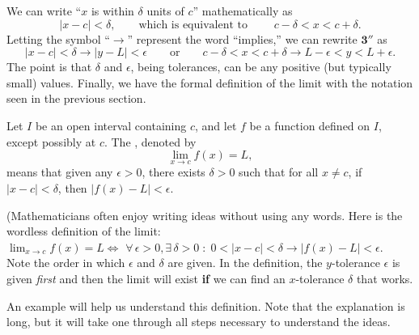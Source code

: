 We can write ``$x$ is within $\delta$ units of $c$'' mathematically as
$$|x-c| < \delta, \qquad \text{which is equivalent to }\qquad c-\delta < x < c+\delta.$$
Letting the symbol ``$\longrightarrow$'' represent the word ``implies,'' we can rewrite $\textbf{3}''$ as 
$$
|x - c| < \delta \longrightarrow  |y - L| < \epsilon 
\qquad \textrm{or} \qquad c - \delta < x < c + \delta \longrightarrow L - \epsilon < y < L + \epsilon.
$$
The point is that $\delta$ and $\epsilon$, being tolerances, can be any positive (but typically small) values.  Finally, we have the formal definition of the limit with the notation  seen in the previous section.

{Let $I$ be an open interval containing $c$, and let $f$ be a function defined on $I$, except possibly at $c$. The , denoted by  
$$\displaystyle \lim_{x\rightarrow c} f(x) = L,$$
means that given any $\epsilon > 0$, there exists $\delta > 0$ such that for all $x\neq c$,  
if  $|x - c| < \delta$, then $|f(x) - L| < \epsilon$.
}

(Mathematicians often enjoy writing ideas without using any words. Here is the wordless definition of the limit:\\

$\displaystyle \lim_{x\rightarrow c} f(x) = L \iff$
$\forall \, \epsilon > 0, \exists \, \delta > 0 \; : \;
0<|x - c| < \delta \longrightarrow |f(x) - L| < \epsilon$.\text{)}\\

Note the order in which $\epsilon$ and $\delta$ are given.  In the definition, the $y$-tolerance $\epsilon$ is given \textit{first} and then the limit will exist {\bf if} we can find an $x$-tolerance $\delta$ that works.  

An example will help us understand this definition.  Note that the explanation is long, but it will take one through all steps necessary to understand the ideas.\\

